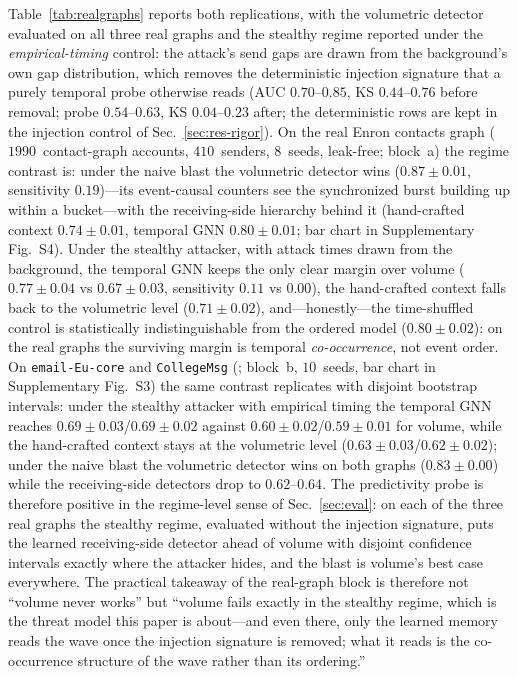 Table~\ref{tab:realgraphs} reports both replications, with the volumetric detector evaluated on all
three real graphs and the stealthy regime reported under the \emph{empirical-timing} control: the attack's
send gaps are drawn from the background's own gap distribution, which removes the deterministic
injection signature that a purely temporal probe otherwise reads (AUC $0.70$--$0.85$, KS
$0.44$--$0.76$ before removal; probe $0.54$--$0.63$, KS $0.04$--$0.23$ after; the deterministic rows
are kept in the injection control of Sec.~\ref{sec:res-rigor}). On the real Enron contacts graph
($1990$~contact-graph accounts, $410$~senders, $8$~seeds, leak-free; block~a) the regime contrast is:
under the naive blast the volumetric detector wins ($0.87{\pm}0.01$, sensitivity $0.19$)---its
event-causal counters see the synchronized burst building up within a bucket---with the receiving-side
hierarchy behind it (hand-crafted context $0.74{\pm}0.01$, temporal GNN $0.80{\pm}0.01$; bar chart in
Supplementary Fig.~S4). Under the stealthy attacker, with attack times drawn from the background, the
temporal GNN keeps the only clear margin over volume ($0.77{\pm}0.04$ vs $0.67{\pm}0.03$,
sensitivity $0.11$ vs $0.00$), the hand-crafted context falls back to the volumetric level
($0.71{\pm}0.02$), and---honestly---the time-shuffled control is statistically indistinguishable from
the ordered model ($0.80{\pm}0.02$): on the real graphs the surviving margin is temporal
\emph{co-occurrence}, not event order. On \texttt{email-Eu-core}
\citep{paranjape2017motifs} and \texttt{CollegeMsg} \citep{panzarasa2009patterns} (\citep{leskovec2014snap};
block~b, $10$~seeds, bar chart in Supplementary Fig.~S3) the same contrast replicates with disjoint
bootstrap intervals: under the stealthy attacker with empirical timing the temporal GNN reaches
$0.69{\pm}0.03$/$0.69{\pm}0.02$ against $0.60{\pm}0.02$/$0.59{\pm}0.01$ for volume, while the hand-crafted
context stays at the volumetric level ($0.63{\pm}0.03$/$0.62{\pm}0.02$); under the naive blast the
volumetric detector wins on both graphs ($0.83{\pm}0.00$) while the receiving-side detectors drop to
$0.62$--$0.64$. The predictivity probe is therefore positive in the regime-level sense of
Sec.~\ref{sec:eval}: on each of the three real graphs the stealthy regime, evaluated without the
injection signature, puts the learned receiving-side detector ahead of volume with disjoint confidence
intervals exactly where the attacker hides, and the blast is volume's best case everywhere. The
practical takeaway of the real-graph block is therefore not ``volume never works'' but ``volume fails
exactly in the stealthy regime, which is the threat model this paper is about---and even there, only
the learned memory reads the wave once the injection signature is removed; what it reads is the
co-occurrence structure of the wave rather than its ordering.''

